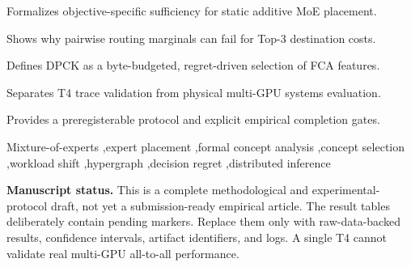 \documentclass[a4paper,preprint,review,12pt,authoryear]{elsarticle}
\begin{document}
\begin{frontmatter}
\begin{graphicalabstract}
\end{graphicalabstract}

\begin{highlights}
\item Formalizes objective-specific sufficiency for static additive MoE placement.
\item Shows why pairwise routing marginals can fail for Top-3 destination costs.
\item Defines DPCK as a byte-budgeted, regret-driven selection of FCA features.
\item Separates T4 trace validation from physical multi-GPU systems evaluation.
\item Provides a preregisterable protocol and explicit empirical completion gates.
\end{highlights}

\begin{keyword}
Mixture-of-experts \sep expert placement \sep formal concept analysis \sep concept selection \sep workload shift \sep hypergraph \sep decision regret \sep distributed inference
\end{keyword}

\end{frontmatter}

\noindent\colorbox{yellow!25}{\parbox{0.97\linewidth}{\textbf{Manuscript status.} This is a complete methodological and experimental-protocol draft, not yet a submission-ready empirical article. The result tables deliberately contain pending markers. Replace them only with raw-data-backed results, confidence intervals, artifact identifiers, and logs. A single T4 cannot validate real multi-GPU all-to-all performance.}}
\end{document}
